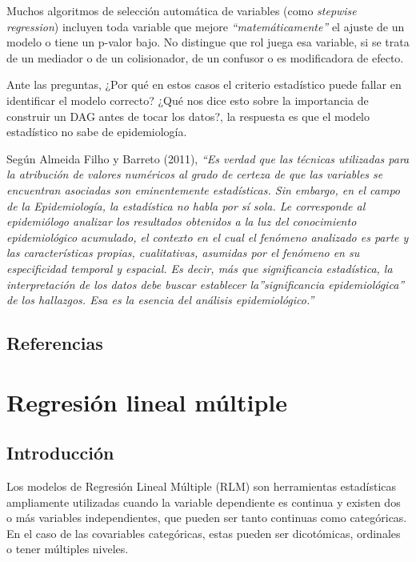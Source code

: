 \documentclass[
  spanish,
  a4paper,
]{scrbook}
\begin{document}
Muchos algoritmos de selección automática de variables (como
\emph{stepwise regression}) incluyen toda variable que mejore
\emph{``matemáticamente''} el ajuste de un modelo o tiene un p-valor
bajo. No distingue que rol juega esa variable, si se trata de un
mediador o de un colisionador, de un confusor o es modificadora de
efecto.

Ante las preguntas, ¿Por qué en estos casos el criterio estadístico
puede fallar en identificar el modelo correcto? ¿Qué nos dice esto sobre
la importancia de construir un DAG antes de tocar los datos?, la
respuesta es que el modelo estadístico no sabe de epidemiología.

Según Almeida Filho y Barreto (2011), \emph{``Es verdad que las técnicas
utilizadas para la atribución de valores numéricos al grado de certeza
de que las variables se encuentran asociadas son eminentemente
estadísticas. Sin embargo, en el campo de la Epidemiología, la
estadística no habla por sí sola. Le corresponde al epidemiólogo
analizar los resultados obtenidos a la luz del conocimiento
epidemiológico acumulado, el contexto en el cual el fenómeno analizado
es parte y las características propias, cualitativas, asumidas por el
fenómeno en su especificidad temporal y espacial. Es decir, más que
significancia estadística, la interpretación de los datos debe buscar
establecer la''significancia epidemiológica'' de los hallazgos. Esa es
la esencia del análisis epidemiológico.''}

\section*{Referencias}\label{referencias-16}


\chapter{Regresión lineal
múltiple}\label{regresiuxf3n-lineal-muxfaltiple}

\section{Introducción}\label{introducciuxf3n-16}

Los modelos de Regresión Lineal Múltiple (RLM) son herramientas
estadísticas ampliamente utilizadas cuando la variable dependiente es
continua y existen dos o más variables independientes, que pueden ser
tanto continuas como categóricas. En el caso de las covariables
categóricas, estas pueden ser dicotómicas, ordinales o tener múltiples
niveles.
\end{document}

